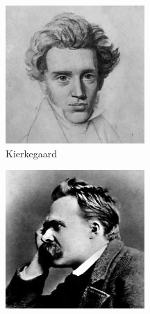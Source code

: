 \documentclass{article}
\begin{document}
\begin{figure}[!t]
			\centering
			\begin{subfigure}[b]{0.4\textwidth}
				\includegraphics[width=\textwidth]{Kierkegaard}
				\caption{Kierkegaard}
			\end{subfigure}
			\begin{subfigure}[b]{0.4\textwidth}
				\includegraphics[width=\textwidth]{Nietzsche}

\end{subfigure}
\end{figure}
\end{document}
